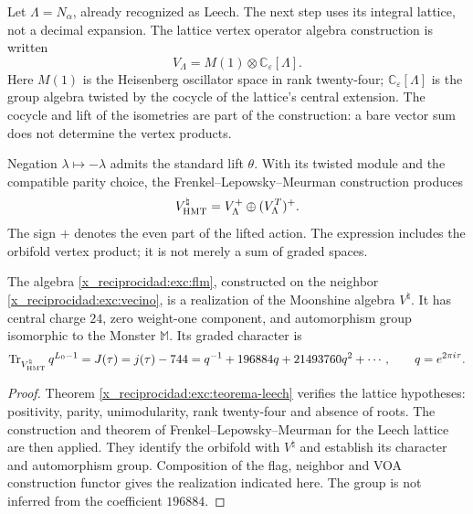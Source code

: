Let $\Lambda=N_\alpha$, already recognized as Leech. The next step
uses its integral lattice, not a decimal expansion. The lattice
vertex operator algebra construction is written
\[
 V_\Lambda=M(1)\otimes\mathbb C_\varepsilon[\Lambda].
\]
Here $M(1)$ is the Heisenberg oscillator space in rank
twenty-four; $\mathbb C_\varepsilon[\Lambda]$ is the group algebra
twisted by the cocycle of the lattice's central extension. The
cocycle and lift of the isometries are part of the
construction: a bare vector sum does not determine the vertex
products.

Negation $\lambda\mapsto-\lambda$ admits the standard lift
$\theta$. With its twisted module and the compatible parity choice,
the Frenkel--Lepowsky--Meurman construction produces
\begin{equation}
 V^\natural_{\rm HMT}
   =V_\Lambda^+\oplus(V_\Lambda^T)^+.
 \label{x_reciprocidad:exc:flm}
\end{equation}
The sign $+$ denotes the even part of the lifted action. The expression
includes the orbifold vertex product; it is not merely a sum
of graded spaces.

\begin{theorem}
\label{x_reciprocidad:exc:moonshine}
The algebra \eqref{x_reciprocidad:exc:flm}, constructed on the neighbor
\eqref{x_reciprocidad:exc:vecino}, is a realization of the Moonshine algebra
$V^\natural$. It has central charge $24$, zero weight-one component,
and automorphism group isomorphic to the Monster $\mathbb M$. Its graded
character is
\begin{equation}
 \operatorname{Tr}_{V^\natural_{\rm HMT}}q^{L_0-1}
   =J(\tau)=j(\tau)-744
   =q^{-1}+196884q+21493760q^2+\cdots,
 \qquad q=e^{2\pi i\tau}.
 \label{x_reciprocidad:exc:j}
\end{equation}
\end{theorem}

\begin{proof}
Theorem \ref{x_reciprocidad:exc:teorema-leech} verifies the lattice hypotheses:
positivity, parity, unimodularity, rank twenty-four and absence of
roots. The construction and theorem of
Frenkel--Lepowsky--Meurman for the Leech lattice are then applied. They identify
the orbifold with $V^\natural$ and establish its character and automorphism
group. Composition of the flag, neighbor and VOA
construction functor gives the realization indicated here. The group is not
inferred from the coefficient $196884$.
\end{proof}


